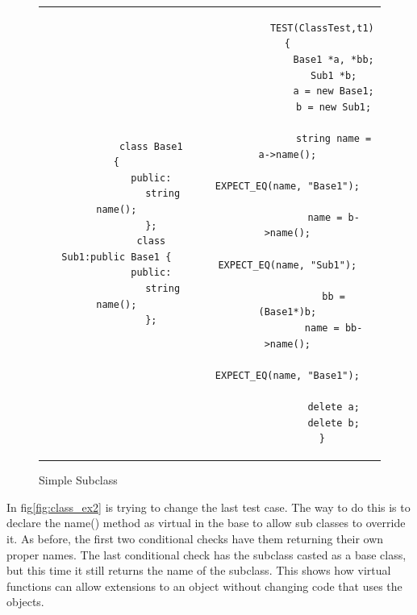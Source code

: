 \documentclass[12pt]{article}
\begin{document}
\begin{figure}[!ht]
	\centering
	\begin{tabular}{c c}
		\begin{minipage}[t]{0.45\textwidth}
		\begin{verbatim}
			class Base1 {
			public:
				string name();
			};
			class Sub1:public Base1 {
			public:
				string name();
			};
		\end{verbatim}
		\end{minipage}
		&
		\begin{minipage}[t]{0.5\textwidth}
		\begin{verbatim}
			TEST(ClassTest,t1){
				Base1 *a, *bb;
				Sub1 *b;
				a = new Base1;
				b = new Sub1;

				string name = a->name();
				EXPECT_EQ(name, "Base1");

				name = b->name();
				EXPECT_EQ(name, "Sub1");

				bb = (Base1*)b;
				name = bb->name();
				EXPECT_EQ(name, "Base1");

				delete a;
				delete b;
			}
		\end{verbatim}
		\end{minipage}
		\\
	\end{tabular}
	\caption{Simple Subclass}
	\label{fig:class_ex1}
\end{figure}

\newpage
In fig\ref{fig:class_ex2} is trying to change the last test case.
The way to do this is to declare the name() method as virtual in the base to allow sub classes to override it.
As before, the first two conditional checks have them returning their own proper names.
The last conditional check has the subclass casted as a base class, but this time it still returns the name of the subclass.
This shows how virtual functions can allow extensions to an object without changing code that uses the objects.
\end{document}
